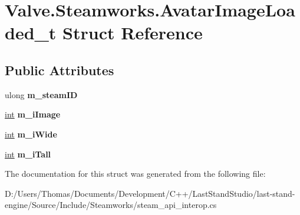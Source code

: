 \hypertarget{structValve_1_1Steamworks_1_1AvatarImageLoaded__t}{}\section{Valve.\+Steamworks.\+Avatar\+Image\+Loaded\+\_\+t Struct Reference}
\label{structValve_1_1Steamworks_1_1AvatarImageLoaded__t}
\subsection*{Public Attributes}
\begin{DoxyCompactItemize}
\item 
\hypertarget{structValve_1_1Steamworks_1_1AvatarImageLoaded__t_a1db737cb28d01d1f6a19c02542bbabd5}{}ulong {\bfseries m\+\_\+steam\+I\+D}\label{structValve_1_1Steamworks_1_1AvatarImageLoaded__t_a1db737cb28d01d1f6a19c02542bbabd5}

\item 
\hypertarget{structValve_1_1Steamworks_1_1AvatarImageLoaded__t_aa67657219c0ee545e6fdb7af5f8e8722}{}\hyperlink{SDL__thread_8h_a6a64f9be4433e4de6e2f2f548cf3c08e}{int} {\bfseries m\+\_\+i\+Image}\label{structValve_1_1Steamworks_1_1AvatarImageLoaded__t_aa67657219c0ee545e6fdb7af5f8e8722}

\item 
\hypertarget{structValve_1_1Steamworks_1_1AvatarImageLoaded__t_a1ae4a8748e9ed02ec2ac78c301c0c1c2}{}\hyperlink{SDL__thread_8h_a6a64f9be4433e4de6e2f2f548cf3c08e}{int} {\bfseries m\+\_\+i\+Wide}\label{structValve_1_1Steamworks_1_1AvatarImageLoaded__t_a1ae4a8748e9ed02ec2ac78c301c0c1c2}

\item 
\hypertarget{structValve_1_1Steamworks_1_1AvatarImageLoaded__t_a10f1b70b37b8f30399788aec134637e2}{}\hyperlink{SDL__thread_8h_a6a64f9be4433e4de6e2f2f548cf3c08e}{int} {\bfseries m\+\_\+i\+Tall}\label{structValve_1_1Steamworks_1_1AvatarImageLoaded__t_a10f1b70b37b8f30399788aec134637e2}

\end{DoxyCompactItemize}


The documentation for this struct was generated from the following file\+:\begin{DoxyCompactItemize}
\item 
D\+:/\+Users/\+Thomas/\+Documents/\+Development/\+C++/\+Last\+Stand\+Studio/last-\/stand-\/engine/\+Source/\+Include/\+Steamworks/steam\+\_\+api\+\_\+interop.\+cs\end{DoxyCompactItemize}
